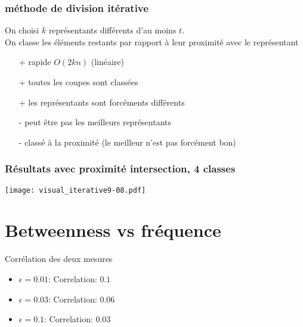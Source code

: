 \documentclass[aspectratio=169]{beamer}
\begin{document}
    \begin{frame}
        \frametitle{méthode de division itérative}
        On choisi $k$ représentants différents d'au moins $t$.\\
        On classe les éléments restants par rapport à leur proximité avec le représentant
        \begin{itemize}
            \item[+] rapide $O(2kn)$ (linéaire)
            \item[+] toutes les coupes sont classées
            \item[+] les représentants sont forcéments différents 
            \item[-] peut être pas les meilleurs représentants 
            \item[-] classé à la proximité (le meilleur n'est pas forcément bon) 
        \end{itemize}
    \end{frame} 

    \begin{frame}
        \frametitle{Résultats avec proximité intersection, 4 classes}
    
        \texttt{[image: visual\_iterative9-08.pdf]}
    
    \end{frame}

    \begin{frame}
        
    \end{frame}
    \section{Betweenness vs fréquence}

    \begin{frame}{Corrélation des deux mesures}
    \begin{itemize}
        \item $\epsilon = 0.01$: Correlation: $0.1$
        \item $\epsilon = 0.03$: Correlation: $0.06$
        \item $\epsilon = 0.1$:  Correlation: $0.03$
    \end{itemize}
    \end{frame}
\end{document}
